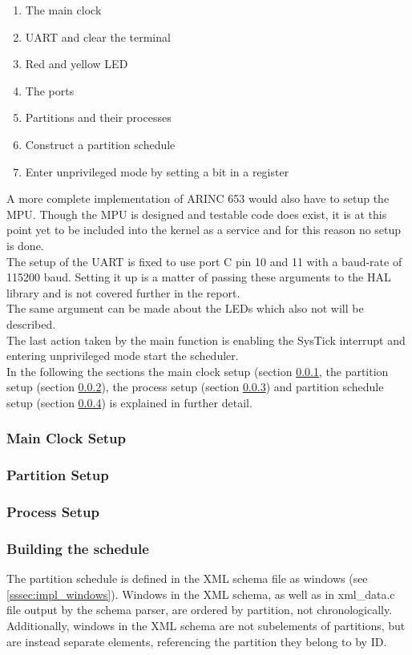 \begin{enumerate}
	\item The main clock
	\item UART and clear the terminal
	\item Red and yellow LED
	\item The ports
	\item Partitions and their processes
	\item Construct a partition schedule
	\item Enter unprivileged mode by setting a bit in a register
\end{enumerate}

A more complete implementation of ARINC 653 would also have to setup the MPU.
Though the MPU is designed and testable code does exist, it is at this point yet
to be included into the kernel as a service and for this reason no setup is done.\\

The setup of the UART is fixed to use port C pin 10 and 11 with a baud-rate of
115200 baud. Setting it up is a matter of passing these arguments to the HAL
library and is not covered further in the report.\\
The same argument can be made about the LEDs which also not will be described.\\

The last action taken by the main function is enabling the SysTick interrupt and
entering unprivileged mode start the scheduler.\\

In the following the sections the main clock setup (section \ref{impl:clock_setup},
the partition setup (section \ref{impl:part_setup}), the process setup (section
\ref{impl:proc_setup}) and partition schedule setup (section \ref{sssec:build_schedule})
is explained in further detail.

\subsubsection{Main Clock Setup}
\label{impl:clock_setup}
\subsubsection{Partition Setup}
\label{impl:part_setup}
\subsubsection{Process Setup}
\label{impl:proc_setup}
\subsubsection{Building the schedule}
\label{sssec:build_schedule}
The partition schedule is defined in the XML schema file as windows (see 
\ref{sssec:impl_windows}). Windows in the XML schema, as well as in xml\_data.c
file output by the schema parser, are ordered by partition, not chronologically.
Additionally, windows in the XML schema are not subelements of partitions, but
are instead separate elements, referencing the partition they belong to by ID.


